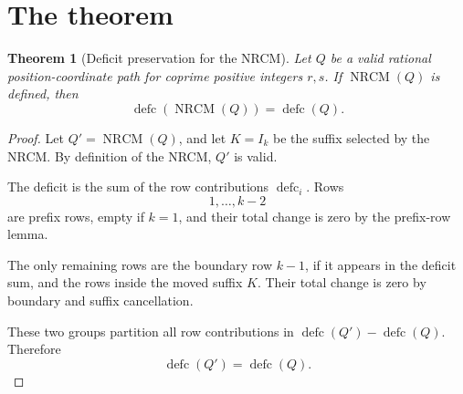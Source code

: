\documentclass[10pt]{article}
\newtheorem{theorem}{Theorem}
\newcommand{\defc}{\operatorname{defc}}
\newcommand{\NRCM}{\operatorname{NRCM}}
\begin{document}
\section{The theorem}

\begin{theorem}[Deficit preservation for the NRCM]
Let \(Q\) be a valid rational position-coordinate path for coprime positive
integers \(r,s\).  If \(\NRCM(Q)\) is defined, then
\[
  \defc(\NRCM(Q))=\defc(Q).
\]
\end{theorem}

\begin{proof}
Let \(Q'=\NRCM(Q)\), and let \(K=I_k\) be the suffix selected by the NRCM.
By definition of the NRCM, \(Q'\) is valid.

The deficit is the sum of the row contributions \(\defc_i\).  Rows
\[
  1,\ldots,k-2
\]
are prefix rows, empty if \(k=1\), and their total change is zero by the
prefix-row lemma.

The only remaining rows are the boundary row \(k-1\), if it appears in the
deficit sum, and the rows inside the moved suffix \(K\).  Their total change is
zero by boundary and suffix cancellation.

These two groups partition all row contributions in
\(\defc(Q')-\defc(Q)\).  Therefore
\[
  \defc(Q')=\defc(Q).
\]
\end{proof}
\end{document}
